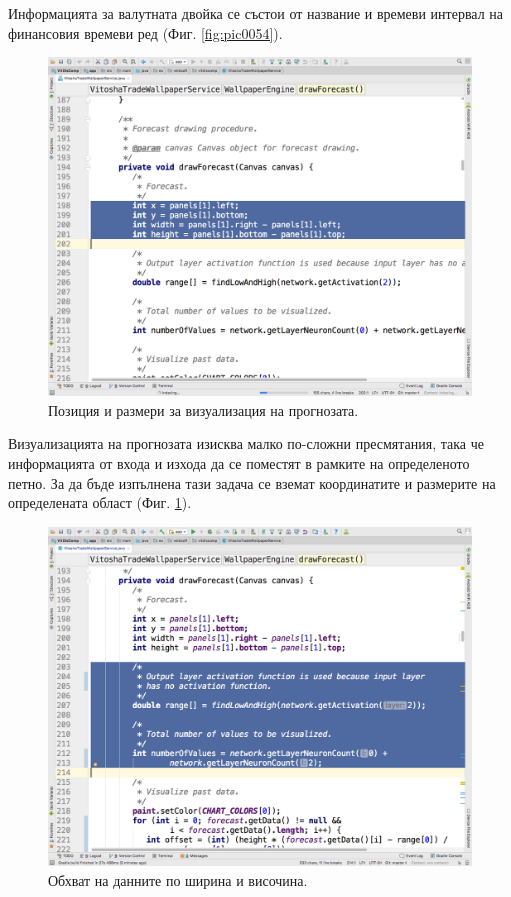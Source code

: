 \documentclass[book,14pt,oneside,openany]{memoir}
\begin{document}
Информацията за валутната двойка се състои от название и времеви интервал на финансовия времеви ред (Фиг. \ref{fig:pic0054}). 

\begin{figure}[h]
  \centering
  \includegraphics[height=0.45\pdfpageheight]{pic0055}
  \caption{Позиция и размери за визуализация на прогнозата.}
\label{fig:pic0055}
\end{figure}
\FloatBarrier

Визуализацията на прогнозата изисква малко по-сложни пресмятания, така че информацията от входа и изхода да се поместят в рамките на определеното петно. За да бъде изпълнена тази задача се вземат координатите и размерите на определената област (Фиг. \ref{fig:pic0055}). 

\begin{figure}[h]
  \centering
  \includegraphics[height=0.45\pdfpageheight]{pic0056}
  \caption{Обхват на данните по ширина и височина.}
\label{fig:pic0056}
\end{figure}
\FloatBarrier
\end{document}
